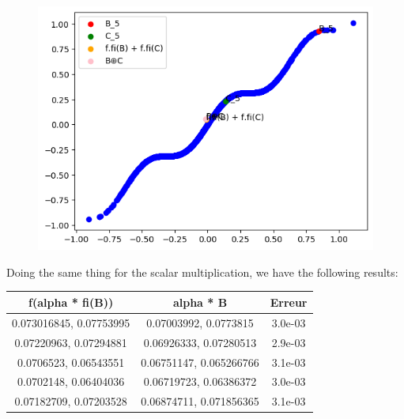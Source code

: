 \documentclass{report}
\begin{document}
            \begin{figure}[h]
                \centering
                \begin{minipage}{0.5\textwidth}
                    \centering
                    \includegraphics[width=0.9\linewidth]{./images/5.png} %
                \end{minipage}%
                \begin{minipage}{0.5\textwidth}
                    \centering
                \end{minipage}
            \end{figure}

            \newpage


            Doing the same thing for the scalar multiplication, we have the following results:\\

            \begin{tabular}{|c|c|c|}
                \hline
                f(alpha * fi(B)) & alpha * B & Erreur \\
                \hline
                0.073016845, 0.07753995 & 0.07003992, 0.0773815 & 3.0e-03 \\
                0.07220963, 0.07294881 & 0.06926333, 0.07280513 & 2.9e-03 \\
                0.0706523, 0.06543551 & 0.06751147, 0.065266766 & 3.1e-03 \\
                0.0702148, 0.06404036 & 0.06719723, 0.06386372 & 3.0e-03 \\
                0.07182709, 0.07203528 & 0.06874711, 0.071856365 & 3.1e-03 \\
                \hline
            \end{tabular}
            \\
\end{document}
